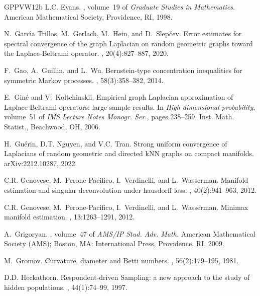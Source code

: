 \documentclass[10pt,a4paper]{article}
\begin{document}
{\begin{thebibliography}{GPPVW12b}
L.C. Evans.
, volume~19 of {\em Graduate
  Studies in Mathematics}.
\newblock American Mathematical Society, Providence, RI, 1998.

N.~{Garc{\'{\i}}a Trillos}, M.~{Gerlach}, M.~{Hein}, and D.~{Slep{\v{c}}ev}.
\newblock Error estimates for spectral convergence of the graph {Laplacian} on
  random geometric graphs toward the {Laplace}-{Beltrami} operator.
, 20(4):827--887, 2020.

F.~Gao, A.~Guillin, and L.~Wu.
\newblock Bernstein-type concentration inequalities for symmetric {M}arkov
  processes.
, 58(3):358--382, 2014.

E.~Gin\'{e} and V.~Koltchinskii.
\newblock Empirical graph {L}aplacian approximation of {L}aplace-{B}eltrami
  operators: large sample results.
\newblock In {\em High dimensional probability}, volume~51 of {\em IMS Lecture
  Notes Monogr. Ser.}, pages 238--259. Inst. Math. Statist., Beachwood, OH,
  2006.

H.~Gu\'erin, D.T. Nguyen, and V.C. Tran.
\newblock Strong uniform convergence of {L}aplacians of random geometric and
  directed k{NN} graphs on compact manifolds.
\newblock arXiv:2212.10287, 2022.

C.R. Genovese, M.~Perone-Pacifico, I.~Verdinelli, and L.~Wasserman.
\newblock Manifold estimation and singular deconvolution under hausdorff loss.
, 40(2):941--963, 2012.

C.R. Genovese, M.~Perone-Pacifico, I.~Verdinelli, and L.~Wasserman.
\newblock Minimax manifold estimation.
, 13:1263--1291, 2012.

A.~{Grigoryan}.
, volume~47 of {\em AMS/IP
  Stud. Adv. Math.}
\newblock American Mathematical Society (AMS); Boston, MA: International Press,
  Providence, RI, 2009.

M.~{Gromov}.
\newblock Curvature, diameter and {B}etti numbers.
, 56(2):179--195, 1981.

D.D. Heckathorn.
\newblock Respondent-driven {S}ampling: a new approach to the study of hidden
  populations.
, 44(1):74--99, 1997.


\end{thebibliography}}
\end{document}
